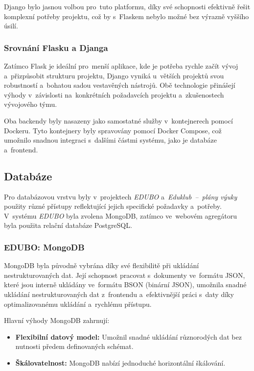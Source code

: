 \documentclass[male,czech,api_bc]{kitheses}
\begin{document}
Django bylo jasnou volbou pro~tuto platformu, díky své schopnosti efektivně řešit komplexní potřeby projektu, což by s~Flaskem nebylo možné bez výrazně vyššího úsilí.

\newpage

\subsubsection{Srovnání Flasku a Djanga}

Zatímco Flask je ideální pro~menší aplikace, kde je potřeba rychle začít vývoj a~přizpůsobit strukturu projektu, Django vyniká u~větších projektů svou robustností a~bohatou sadou vestavěných nástrojů. Obě technologie přinášejí výhody v~závislosti na~konkrétních požadavcích projektu a~zkušenostech vývojového týmu.

Oba backendy byly nasazeny jako samostatné služby v~kontejnerech pomocí Dockeru. Tyto kontejnery byly spravovány pomocí Docker Compose, což umožnilo snadnou integraci s~dalšími částmi systému, jako je databáze a~frontend.

\subsection{Databáze}

Pro databázovou vrstvu byly v~projektech \textit{EDUBO} a~\textit{Eduklub~--~plány výuky} použity různé přístupy reflektující jejich specifické požadavky a~potřeby. V~systému \textit{EDUBO} byla zvolena MongoDB, zatímco ve~webovém agregátoru byla použita relační databáze PostgreSQL.

\subsubsection{EDUBO: MongoDB}

MongoDB byla původně vybrána díky své flexibilitě při ukládání nestrukturovaných dat. Její schopnost pracovat s~dokumenty ve~formátu JSON, které jsou interně ukládány ve~formátu BSON (binární JSON), umožnila snadné ukládání nestrukturovaných dat z~frontendu a~efektivnější práci s~daty díky optimalizovanému ukládání a~rychlému přístupu.

Hlavní výhody MongoDB zahrnují:
\begin{itemize}
	\item \textbf{Flexibilní datový model:} Umožnil snadné ukládání různorodých dat bez nutnosti předem definovaných schémat.
	\item \textbf{Škálovatelnost:} MongoDB nabízí jednoduché horizontální škálování.
\end{itemize}
\end{document}
